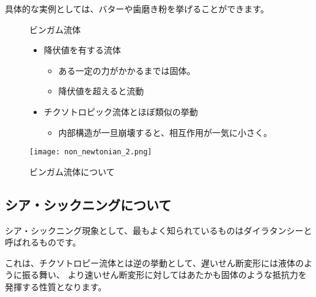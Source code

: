 \documentclass[uplatex,dvipdfmx,a4paper,11pt]{jsarticle}
\begin{document}
具体的な実例としては、バターや歯磨き粉を挙げることができます。
\begin{figure}[htb]
	\begin{center}
		\begin{minipage}{0.5\textwidth}
			\begin{itembox}[l]{ビンガム流体}
				\begin{itemize}
					\item 降伏値を有する流体
					\begin{itemize}
						\item ある一定の力がかかるまでは固体。
						\item 降伏値を超えると流動
					\end{itemize}
					\item チクソトロピック流体とほぼ類似の挙動
					\begin{itemize}
						\item 内部構造が一旦崩壊すると、相互作用が一気に小さく。
					\end{itemize}
				\end{itemize}
			\end{itembox}
			
		\end{minipage}
		\begin{minipage}{0.4\textwidth}
			\begin{center}
			\texttt{[image: non\_newtonian\_2.png]}
			\end{center}
		\end{minipage}
		\caption{ビンガム流体について}
		\label{fig:bingham}
	\end{center}
\end{figure}

\subsection{シア・シックニングについて}

シア・シックニング現象として、最もよく知られているものはダイラタンシーと呼ばれるものです。

これは、チクソトロピー流体とは逆の挙動として、遅いせん断変形には液体のように振る舞い、
より速いせん断変形に対してはあたかも固体のような抵抗力を発揮する性質となります。
\end{document}
